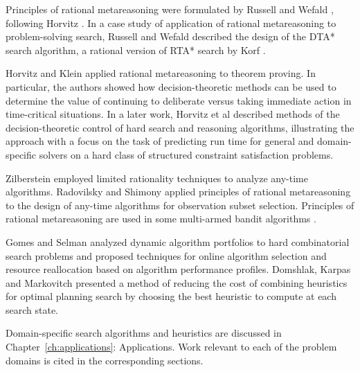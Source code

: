 Principles of rational metareasoning were formulated by Russell
and Wefald \cite{Russell.right}, following Horvitz
\cite{Horvitz.reasoningabout}. In a case study of application of rational
metareasoning to problem-solving search, Russell and Wefald
\cite{Russell.right} described the design of the DTA* search algorithm,
a rational version of RTA* search by Korf \cite{Korf.rta}. 

Horvitz and Klein \cite{Horvitz.proving} applied rational
metareasoning to theorem proving. In particular, the authors showed how
decision-theoretic methods can be used to determine the value of
continuing to deliberate versus taking immediate action in
time-critical situations. In a later work, Horvitz et al
\cite{Horvitz.bayesian} described methods of the
decision-theoretic control of hard search and
reasoning algorithms, illustrating the approach with a focus on the
task of predicting run time for general and domain-specific solvers on
a hard class of structured constraint satisfaction problems. 

Zilberstein \cite{Zilberstein.PHD} employed limited rationality
techniques to analyze any-time algorithms. Radovilsky and Shimony
\cite{Radovilsky.oss} applied principles of rational metareasoning to
the design of any-time algorithms for observation subset
selection. Principles of rational metareasoning are used in some
multi-armed bandit algorithms \cite{Vermorel.bandits}.

Gomes and Selman \cite{Gomes.portfolio} analyzed dynamic algorithm
portfolios to hard combinatorial search problems and proposed
techniques for online algorithm selection and resource reallocation
based on algorithm performance profiles. Domshlak, Karpas and
Markovitch \cite{Domshlak.maxornot} presented a method of reducing the
cost of combining heuristics for optimal planning search by choosing
the best heuristic to compute at each search state.

Domain-specific search algorithms and heuristics are discussed in 
Chapter~\ref{ch:applications}: Applications. Work relevant to each of
the problem domains is cited in the corresponding sections. 
